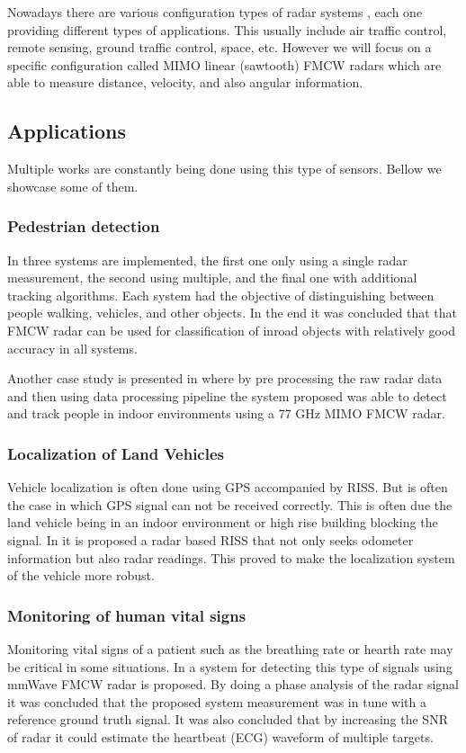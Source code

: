 Nowadays there are various configuration types of radar systems  \cite{typesradar}, each one providing different types of applications. This usually include air traffic control, remote sensing, ground traffic control, space, etc.  However we will focus on a specific configuration called \ac{MIMO} linear (sawtooth)  \ac{FMCW} radars which are  able to measure distance, velocity, and also angular information. 

\subsection{Applications}
Multiple works are constantly being done using this type of sensors. Bellow we showcase some of them.

  \subsubsection{Pedestrian detection}  
 In \cite{heuel2010pedestrian} three systems are implemented, the first one only using a single radar measurement, the second using multiple, and the final one with additional tracking algorithms. Each system had the objective of distinguishing between people walking, vehicles, and other objects. In the end it was concluded that that \ac{FMCW} \ac{radar} can be used for classification of inroad objects with relatively good accuracy in all systems.
  
   Another case study is presented in \cite{knudde2017indoor} where by pre processing the raw radar data and then using  data processing pipeline the system proposed was able to detect and track people in indoor environments using a 77 GHz \ac{MIMO} \ac{FMCW} radar.
   
 \subsubsection{Localization of Land Vehicles}  
  Vehicle localization is often done using \ac{GPS} accompanied by \ac{RISS}. But is often the case in which \ac{GPS} signal can not be received correctly. This is often due the land vehicle being in an indoor environment or high rise building blocking the signal. In \cite{abosekeen2018utilizing} it is proposed a radar based \ac{RISS} that not only seeks odometer information but also radar readings. This proved to make the localization system of the vehicle more robust.
  
\subsubsection{Monitoring of human vital signs}  
Monitoring vital signs of a patient such as the breathing rate or hearth rate may be critical in some situations.
In \cite{alizadeh2019remote} a system for detecting this type of signals using \ac{mmWave} \ac{FMCW} \ac{radar} is proposed. By doing a phase analysis of the \ac{radar} signal it was concluded that the proposed system measurement was in tune with a reference ground truth signal. It was also concluded that by increasing the \ac{SNR} of \ac{radar} it could estimate the heartbeat (\ac{ECG}) waveform of multiple targets.


